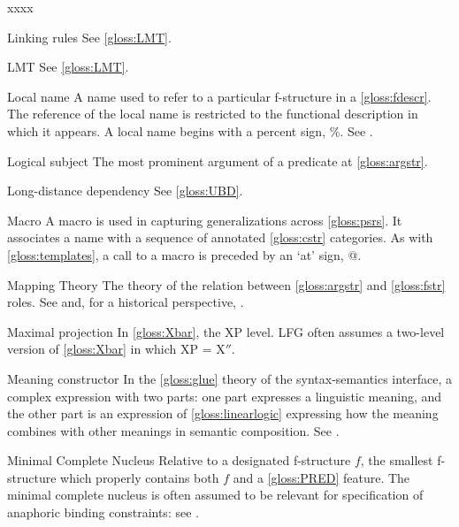 \documentclass[output=paper,colorlinks,citecolor=brown]{langscibook}
\begin{document}
\begin{labeling}{xxxx}
\item[Linking rules] See \ref{gloss:LMT}.

\item[LMT] See \ref{gloss:LMT}.

\item[Local name] A name used to refer to a particular f-structure in a \ref{gloss:fdescr}.  The reference of the local name is restricted to the functional description in which it appears.  A local name begins with a percent sign, \%.  See \citetv[\ref{sec:CoreConcepts:localname}]{chapters/CoreConcepts}.

\item[Logical subject\namedlabel{gloss:LogSubj}{Logical subject}] The most prominent argument of a predicate at \ref{gloss:argstr}.

\item[Long-distance dependency] See \ref{gloss:UBD}.

\item[Macro]  A macro is used in capturing generalizations across \ref{gloss:psrs}.  It associates a name with a sequence of annotated \ref{gloss:cstr} categories.  As with \ref{gloss:templates}, a call to a macro is preceded by an `at' sign, @.

\item[Mapping Theory\namedlabel{gloss:Mapping}{Mapping Theory}] The theory of the relation between \ref{gloss:argstr} and \ref{gloss:fstr} roles.  See  and, for a historical perspective, \citetv[\ref{sec:Historical:arg-gf}]{chapters/Historical}.

\item[Maximal projection] In \ref{gloss:Xbar}, the XP level.  LFG often assumes a two-level version of \ref{gloss:Xbar} in which XP = X$''$.

\item[Meaning constructor\namedlabel{gloss:constructor}{meaning constructor}] In the \ref{gloss:glue} theory of the syntax-semantics interface, a complex expression with two parts: one part expresses a linguistic meaning, and the other part is an expression of \ref{gloss:linearlogic} expressing how the meaning combines with other meanings in semantic composition. See .

\item[Minimal Complete Nucleus] Relative to a designated f-structure $f$, the smallest f-structure which properly contains both $f$ and a \ref{gloss:PRED} feature.  The minimal complete nucleus is often assumed to be relevant for specification of anaphoric binding constraints: see .


\end{labeling}
\end{document}
